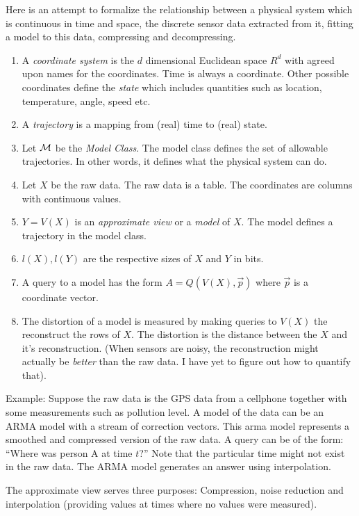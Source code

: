 \documentclass[11pt]{article}
\begin{document}
Here is an attempt to formalize the relationship between a physical
system which is continuous in time and space, the discrete sensor data
extracted from it, fitting a model to this data, compressing and
decompressing.
\begin{enumerate}
\item A {\em coordinate system} is the $d$ dimensional Euclidean space
  $R^d$ with agreed upon names for the coordinates. Time is always a
  coordinate. Other possible coordinates define the {\em state} which
  includes quantities such as location, temperature, angle, speed etc. 
\item A {\em trajectory} is a mapping from (real) time to (real) state.
\item Let ${\cal M}$ be the {\em Model Class}. The model class defines
  the set of allowable trajectories. In other words, it defines what
  the physical system can do.
\item Let $X$ be the raw data. The raw data is a table. The
  coordinates are columns with continuous values.
\item $Y=V(X)$ is an {\em approximate view} or a {\em model} of
  $X$. The model defines a trajectory in the model class.
\item $l(X),l(Y)$ are the respective sizes of $X$ and $Y$ in bits.
\item A query to a model has the form $A=Q(V(X),\vec{p})$ where
  $\vec{p}$ is a coordinate vector.
\item The distortion of a model is measured by making queries to
  $V(X)$ the reconstruct the rows of $X$. The distortion is the
  distance between the $X$ and it's reconstruction. (When sensors are
  noisy, the reconstruction might actually be {\em better} than the
  raw data. I have yet to figure out how to quantify that).

\end{enumerate}

Example: Suppose the raw data is the GPS data from a cellphone
together with some measurements such as pollution level. A model of
the data can be an ARMA model with a stream of correction
vectors. This arma model represents a smoothed and compressed version
of the raw data. A query can be of the form: ``Where was person A at
time $t$?''  Note that the particular time might not exist in the raw
data. The ARMA model generates an answer using interpolation.

The approximate view serves three purposes: Compression, noise
reduction and interpolation (providing values at times where no values
were measured).
\end{document}
